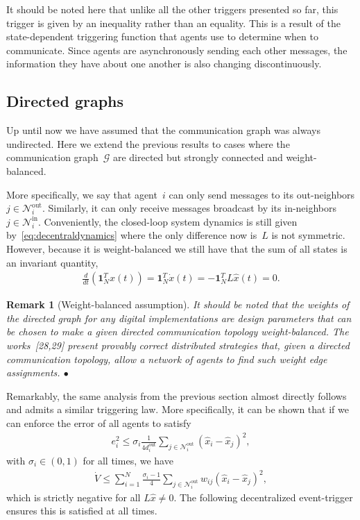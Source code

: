 \documentclass[]{book}
\newtheorem{remark}[theorem]{Remark}
\newcommand{\GG}{{\mathcal{G}}}
\newcommand{\NN}{{\mathcal{N}}}
\newcommand{\oprocendsymbol}{\hbox{$\bullet$}}
\newcommand{\oprocend}{\relax\ifmmode\else\unskip\hfill\fi\oprocendsymbol}
\begin{document}
It should be noted here that unlike all the other triggers presented
so far, this trigger is given by an inequality rather than an
equality. This is a result of the state-dependent triggering function
that agents use to determine when to communicate.  Since agents are
asynchronously sending each other messages, the information they have
about one another is also changing discontinuously.

\subsection{Directed graphs}\label{se:directed}

Up until now we have assumed that the communication graph was always
undirected. Here we extend the previous results to cases where the
communication graph~$\GG$ are directed but strongly connected and
weight-balanced.

More specifically, we say that agent~$i$ can only send messages to its
out-neighbors $j \in \NN_i^\text{out}$. Similarly, it can only receive
messages broadcast by its in-neighbors $j \in \NN_i^\text{in}$.
Conveniently, the closed-loop system dynamics is still given
by~\eqref{eq:decentraldynamics} where the only difference now is~$L$
is not symmetric. However, because it is weight-balanced we still have
that the sum of all states is an invariant quantity,
\begin{align*}
  \frac{d}{dt} \left( \mathbf{1}^T_N x(t) \right) = \mathbf{1}_N^T
  \dot{x}(t) = -\mathbf{1}_N^T L \hat{x}(t) = 0.
\end{align*}

\begin{remark}[Weight-balanced assumption] {\rm It should be noted
    that the weights of the directed graph for any digital
    implementations are design parameters that can be chosen to make a
    given directed communication topology weight-balanced. The
    works~[28,29] present provably correct
    distributed strategies that, given a directed communication
    topology, allow a network of agents to find such weight edge
    assignments. } \oprocend
\end{remark}

Remarkably, the same analysis from the previous section almost
directly follows and admits a similar triggering law. More
specifically, it can be shown that if we can enforce the error of all
agents to satisfy
\begin{align*}
  e_i^2 \leq \sigma_i \frac{1}{4 d_i^\text{out}} \sum_{j \in
    \NN_i^\text{out}} (\hat{x}_i - \hat{x}_j)^2 ,
\end{align*}
with $\sigma_i \in (0,1)$ for all times, we have
\begin{align}\label{eq:actual}
  \dot{V} \leq \sum_{i=1}^N \frac{\sigma_i - 1}{4} \sum_{j \in
    \NN_i^\text{out}} w_{ij} (\hat{x}_i - \hat{x}_j)^2,
\end{align}
which is strictly negative for all $L\hat{x} \neq 0$. The following
decentralized event-trigger ensures this is satisfied at all times.
\end{document}
